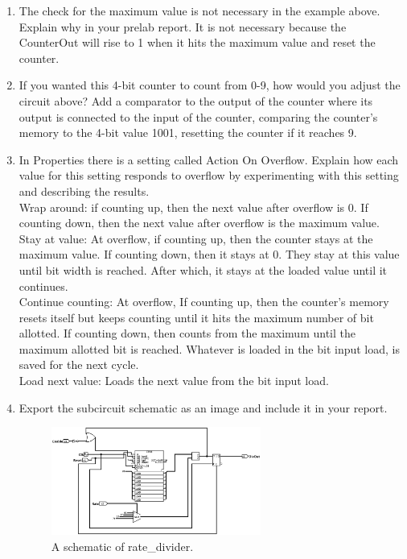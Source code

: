 \documentclass{article}
\begin{document}
\begin{enumerate}
\item The check for the maximum value is not necessary in the example above. Explain why in your prelab report.
It is not necessary because the CounterOut will rise to 1 when it hits the maximum value and reset the counter.

\item If you wanted this 4-bit counter to count from 0-9, how would you adjust the circuit above?
Add a comparator to the output of the counter where its output is connected to the input of the counter, comparing the counter's memory to the 4-bit value 1001, resetting the counter if it reaches 9.

\item In Properties there is a setting called Action On Overflow. Explain how each value for this setting responds to overflow by experimenting with this setting and describing the results. \\
Wrap around: if counting up, then the next value after overflow is 0. If counting down, then the next value after overflow is the maximum value.\\
Stay at value: At overflow, if counting up, then the counter stays at the maximum value. If counting down, then it stays at 0. They stay at this value until bit width is reached. After which, it stays at the loaded value until it continues. \\
Continue counting: At overflow, If counting up, then the counter's memory resets itself but keeps counting until it hits the maximum number of bit allotted. If counting down, then counts from the maximum until the maximum allotted bit is reached. Whatever is loaded in the bit input load, is saved for the next cycle. \\
Load next value: Loads the next value from the bit input load.

\item Export the subcircuit schematic as an image and include it in your report.

\begin{figure}[ht!]
    \centering
    \includegraphics[width=0.65\textwidth]{lab5_rate_divider.png}
    \caption{A schematic of rate\_divider.}
    \label{f:rate_divider}
\end{figure}


\end{enumerate}
\end{document}
